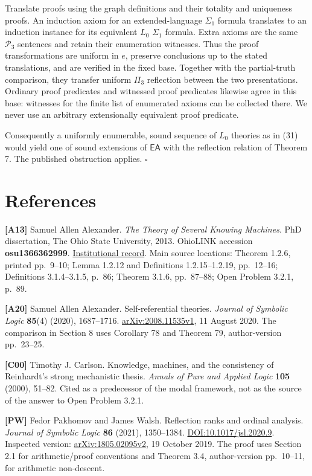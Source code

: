 \documentclass[
  11pt,
  letterpaper,
]{article}
\begin{document}
Translate proofs using the graph definitions and their totality and
uniqueness proofs. An induction axiom for an extended-language
\(\Sigma_1\) formula translates to an induction instance for its
equivalent \(L_0\) \(\Sigma_1\) formula. Extra axioms are the same
\(\mathcal P_3\) sentences and retain their enumeration witnesses. Thus
the proof transformations are uniform in \(e\), preserve conclusions up
to the stated translations, and are verified in the fixed base. Together
with the partial-truth comparison, they transfer uniform \(\Pi_3\)
reflection between the two presentations. Ordinary proof predicates and
witnessed proof predicates likewise agree in this base: witnesses for
the finite list of enumerated axioms can be collected there. We never
use an arbitrary extensionally equivalent proof predicate.

Consequently a uniformly enumerable, sound sequence of \(L_0\) theories
as in (31) would yield one of sound extensions of \(\mathsf{EA}\) with
the reflection relation of Theorem 7. The published obstruction applies.
\hfill\(\square\)

\section{References}\label{references}

\textbf{{[}A13{]}} Samuel Allen Alexander. \emph{The Theory of Several
Knowing Machines}. PhD dissertation, The Ohio State University, 2013.
OhioLINK accession \textbf{osu1366362999}.
\href{https://rave.ohiolink.edu/etdc/view?acc_num=osu1366362999}{Institutional
record}. Main source locations: Theorem 1.2.6, printed pp.~9--10; Lemma
1.2.12 and Definitions 1.2.15--1.2.19, pp.~12--16; Definitions
3.1.4--3.1.5, p.~86; Theorem 3.1.6, pp.~87--88; Open Problem 3.2.1,
p.~89.

\textbf{{[}A20{]}} Samuel Allen Alexander. Self-referential theories.
\emph{Journal of Symbolic Logic} \textbf{85}(4) (2020), 1687--1716.
\href{https://arxiv.org/abs/2008.11535v1}{arXiv:2008.11535v1}, 11 August
2020. The comparison in Section 8 uses Corollary 78 and Theorem 79,
author-version pp.~23--25.

\textbf{{[}C00{]}} Timothy J. Carlson. Knowledge, machines, and the
consistency of Reinhardt's strong mechanistic thesis. \emph{Annals of
Pure and Applied Logic} \textbf{105} (2000), 51--82. Cited as a
predecessor of the modal framework, not as the source of the answer to
Open Problem 3.2.1.

\textbf{{[}PW{]}} Fedor Pakhomov and James Walsh. Reflection ranks and
ordinal analysis. \emph{Journal of Symbolic Logic} \textbf{86} (2021),
1350--1384.
\href{https://doi.org/10.1017/jsl.2020.9}{DOI:10.1017/jsl.2020.9}.
Inspected version:
\href{https://arxiv.org/abs/1805.02095v2}{arXiv:1805.02095v2}, 19
October 2019. The proof uses Section 2.1 for arithmetic/proof
conventions and Theorem 3.4, author-version pp.~10--11, for arithmetic
non-descent.
\end{document}
